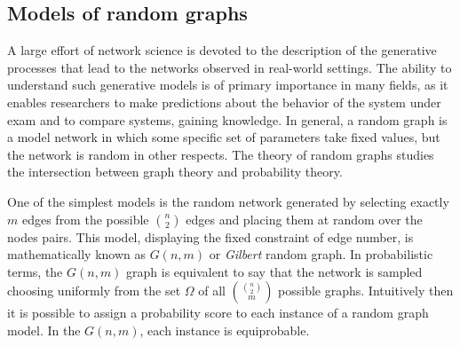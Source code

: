 
\subsection{Models of random graphs}\label{sec:models_random_graph}
A large effort of network science is devoted to the description of the generative processes that lead to the networks observed in real-world settings. The ability to understand such generative models is of primary importance in many fields, as it enables researchers to make predictions about the behavior of the system under exam and to compare systems, gaining knowledge.
In general, a random graph is a model network in which some specific set of parameters take fixed values, but the network is random in other respects.
The theory of random graphs studies the intersection between graph theory and probability theory.

One of the simplest models is the random network generated by selecting exactly $m$ edges from the possible $\binom{n}{2}$ edges and placing them at random over the nodes pairs.
This model, displaying the fixed constraint of edge number, is mathematically known as $G(n,m)$ or \emph{Gilbert} random graph.
In probabilistic terms, the $G(n,m)$ graph is equivalent to say that the network is sampled choosing uniformly from the set $\Omega$ of all $\binom{\binom{n}{2}}{m}$ possible graphs. Intuitively then it is possible to assign a probability score to each instance of a random graph model. In the $G(n,m)$, each instance is equiprobable.

